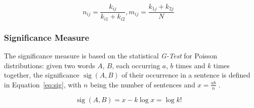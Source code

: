 \begin{equation}
  n_{ij} = \frac{k_{ij}}{k_{i1} + k_{i2}}, m_{ij} = \frac{k_{1j} + k_{2j}}{N}
\end{equation}

\subsubsection*{Significance Measure}

The significance measure is based on the statistical \emph{G-Test} for Poisson
distributions: given two words $A$, $B$, each occurring $a$, $b$ times and $k$
times together, the significance $\operatorname{sig}(A, B)$ of their occurrence
in a sentence is defined in Equation~\ref{eq:sig}, with $n$ being the number of
sentences and $x = \frac{ab}{n}$ \citep{biemann2004language}.

\begin{equation}
  \label{eq:sig}
  \operatorname{sig}(A,B) = x - k \log x = \log k!
\end{equation}


